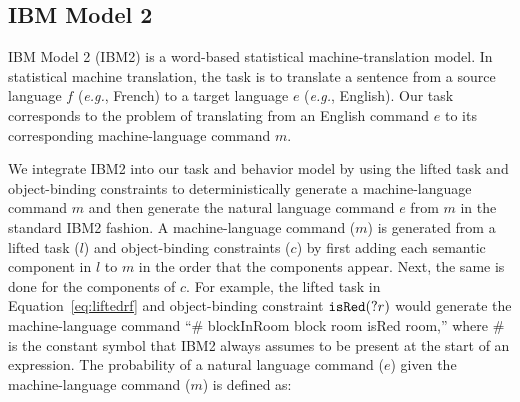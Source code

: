 \documentclass[conference]{IEEEtran}
\begin{document}

\subsection{IBM Model 2}

IBM Model 2 (IBM2) \cite{brown90,brown93} is a word-based statistical machine-translation model. In statistical machine translation, the task is to translate a sentence from a source language $f$ (\emph{e.g.}, French) to a target language $e$ (\emph{e.g.}, English). Our task corresponds to the problem of translating from an English command $e$ to its corresponding machine-language command $m$. 

We integrate IBM2 into our task and behavior model by using the lifted task and object-binding constraints to deterministically generate a machine-language command $m$ and then generate the natural language command $e$ from $m$ in the standard IBM2 fashion. 
A machine-language command ($m$) is generated from a lifted task ($l$) and object-binding constraints ($c$) by first adding each semantic component in $l$
to $m$ in the order that the components appear. Next, the same is done for the components of $c$. For example, the lifted task in Equation~\ref{eq:liftedrf} and object-binding constraint ${\tt isRed}(?r)$ would generate the machine-language command ``\# blockInRoom block room isRed room,'' where \# is the constant symbol that IBM2 always assumes to be present at the start of an expression. The probability of a natural language command ($e$) given the machine-language command ($m$) is defined as:
\end{document}
